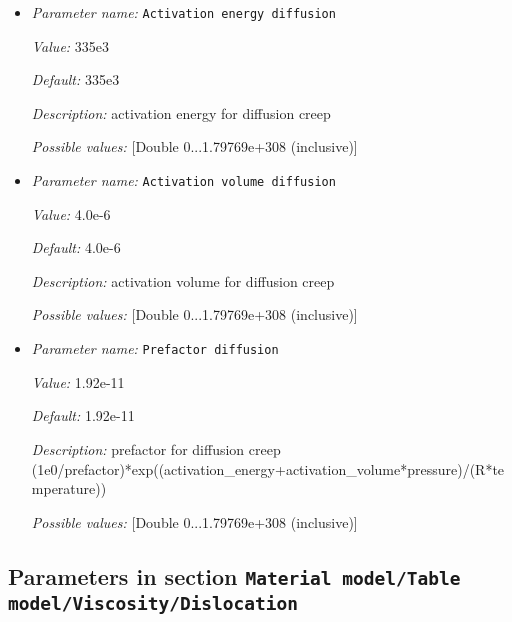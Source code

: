 \begin{itemize}
\item {\it Parameter name:} {\tt Activation energy diffusion}


{\it Value:} 335e3


{\it Default:} 335e3


{\it Description:} activation energy for diffusion creep


{\it Possible values:} [Double 0...1.79769e+308 (inclusive)]
\item {\it Parameter name:} {\tt Activation volume diffusion}


{\it Value:} 4.0e-6


{\it Default:} 4.0e-6


{\it Description:} activation volume for diffusion creep


{\it Possible values:} [Double 0...1.79769e+308 (inclusive)]
\item {\it Parameter name:} {\tt Prefactor diffusion}


{\it Value:} 1.92e-11


{\it Default:} 1.92e-11


{\it Description:} prefactor for diffusion creep (1e0/prefactor)*exp((activation\_energy+activation\_volume*pressure)/(R*temperature))


{\it Possible values:} [Double 0...1.79769e+308 (inclusive)]
\end{itemize}

\subsection{Parameters in section \tt Material model/Table model/Viscosity/Dislocation}
\label{parameters:Material_20model/Table_20model/Viscosity/Dislocation}

